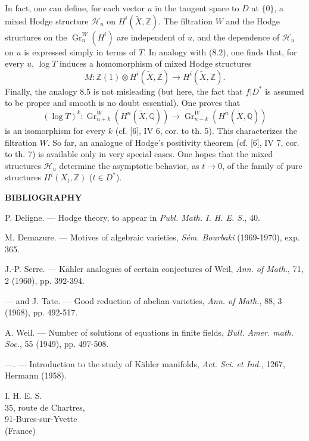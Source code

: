 \documentclass[10pt]{article}
\newcommand{\Q}{\mathbb Q}
\newcommand{\Z}{\mathbb Z}
\newcommand{\Gr}{\operatorname{Gr}}
\newcommand{\wt}{\widetilde}
\newcommand{\calH}{\mathcal H}
\begin{document}
In fact, one can define, for each vector $u$ in the tangent space to $D$ at $\{0\}$, a mixed Hodge structure $\calH_u$ on $H^i(\wt X,\Z)$. The filtration $W$ and the Hodge structures on the $\Gr_n^W(H^i)$ are independent of $u$, and the dependence of $\calH_u$ on $u$ is expressed simply in terms of $T$. In analogy with (8.2), one finds that, for every $u$, $\log T$ induces a homomorphism of mixed Hodge structures
\[
M:\Z(1)\otimes H^i(\wt X,\Z)\longrightarrow H^i(\wt X,\Z).
\]
Finally, the analogy 8.5 is not misleading (but here, the fact that $f|D^*$ is assumed to be proper and smooth is no doubt essential). One proves that
\[
(\log T)^k:\Gr_{n+k}^W(H^n(\wt X,\Q))\longrightarrow\Gr_{n-k}^W(H^n(\wt X,\Q))
\]
is an isomorphism for every $k$ (cf. [6], IV 6, cor. to th. 5). This characterizes the filtration $W$. So far, an analogue of Hodge's positivity theorem (cf. [6], IV 7, cor. to th. 7) is available only in very special cases. One hopes that the mixed structures $\calH_u$ determine the asymptotic behavior, as $t\to0$, of the family of pure structures $H^i(X_t,\Z)$ ($t\in D^*$).

\begin{center}
\bfseries BIBLIOGRAPHY
\end{center}
\begin{enumerate}[label={[\arabic*]},leftmargin=2.2em,itemsep=0.1em]
\item P. Deligne. — Hodge theory, to appear in \emph{Publ. Math. I. H. E. S.}, 40.
\item M. Demazure. — Motives of algebraic varieties, \emph{Sém. Bourbaki} (1969-1970), exp. 365.
\item J.-P. Serre. — Kähler analogues of certain conjectures of Weil, \emph{Ann. of Math.}, 71, 2 (1960), pp. 392-394.
\item — and J. Tate. — Good reduction of abelian varieties, \emph{Ann. of Math.}, 88, 3 (1968), pp. 492-517.
\item A. Weil. — Number of solutions of equations in finite fields, \emph{Bull. Amer. math. Soc.}, 55 (1949), pp. 497-508.
\item —. — Introduction to the study of Kähler manifolds, \emph{Act. Sci. et Ind.}, 1267, Hermann (1958).
\end{enumerate}

\begin{flushleft}
I. H. E. S.\\
35, route de Chartres,\\
91-Bures-sur-Yvette\\
(France)
\end{flushleft}
\end{document}
